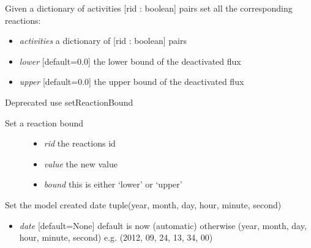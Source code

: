 \documentclass[a4paper,11pt,english]{sphinxmanual}
\begin{document}
\begin{fulllineitems}
\begin{fulllineitems}
\label{modules_doc:cbmpy.CBModel.Model.setAllProteinActivities}
Given a dictionary of activities {[}rid : boolean{]} pairs set all the corresponding reactions:
\begin{itemize}
\item {} 
\emph{activities} a dictionary of {[}rid : boolean{]} pairs

\item {} 
\emph{lower} {[}default=0.0{]} the lower bound of the deactivated flux

\item {} 
\emph{upper} {[}default=0.0{]} the upper bound of the deactivated flux

\end{itemize}

\end{fulllineitems}


\begin{fulllineitems}
\label{modules_doc:cbmpy.CBModel.Model.setBoundValueByName}
Deprecated use setReactionBound
\begin{description}
\item[{Set a reaction bound}] \leavevmode\begin{itemize}
\item {} 
\emph{rid} the reactions id

\item {} 
\emph{value} the new value

\item {} 
\emph{bound} this is either `lower' or `upper'

\end{itemize}

\end{description}

\end{fulllineitems}


\begin{fulllineitems}
\label{modules_doc:cbmpy.CBModel.Model.setCreatedDate}
Set the model created date tuple(year, month, day, hour, minute, second)
\begin{itemize}
\item {} 
\emph{date} {[}default=None{]} default is now (automatic) otherwise (year, month, day, hour, minute, second) e.g. (2012, 09, 24, 13, 34, 00)


\end{itemize}
\end{fulllineitems}
\end{fulllineitems}
\end{document}
